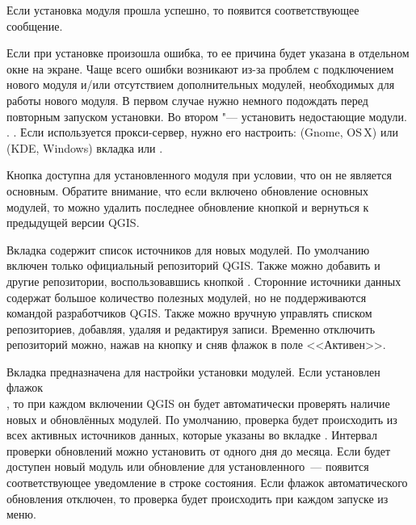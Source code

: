 Если установка модуля прошла успешно, то появится соответствующее
сообщение.

Если при установке произошла ошибка, то ее причина будет указана в
отдельном окне на экране. Чаще всего ошибки возникают из-за проблем с
подключением нового модуля и/или отсутствием дополнительных модулей,
необходимых для работы нового модуля. В первом случае нужно немного
подождать перед повторным запуском установки. Во втором "--- установить
недостающие модули.
.
.
Если используется прокси-сервер, нужно его настроить:
 \arrow {} (Gnome, OS\,X)
или  \arrow {} (KDE, Windows)
вкладка  или .

Кнопка  доступна для установленного модуля при
условии, что он не является основным. Обратите внимание, что если
включено обновление основных модулей, то можно удалить последнее
обновление кнопкой   и вернуться к предыдущей
версии QGIS.


Вкладка  содержит список источников для новых модулей.
По умолчанию включен только официальный репозиторий QGIS. Также можно
добавить и другие репозитории, воспользовавшись кнопкой
. Сторонние источники данных
содержат большое количество полезных модулей, но не поддерживаются
командой разработчиков QGIS. Также можно вручную управлять списком
репозиториев, добавляя, удаляя и редактируя записи. Временно отключить
репозиторий можно, нажав на кнопку  и сняв флажок
в поле <<Активен>>.


Вкладка  предназначена для настройки установки модулей.
Если установлен флажок \\
, то
при каждом включении QGIS он будет автоматически проверять наличие
новых и обновлённых модулей. По умолчанию, проверка будет происходить
из всех активных источников данных, которые указаны во вкладке
. Интервал проверки обновлений можно установить от
одного дня до месяца. Если будет доступен новый модуль или обновление
для установленного~--- появится соответствующее уведомление в строке
состояния. Если флажок автоматического обновления отключен, то проверка
будет происходить при каждом запуске  из
меню.


